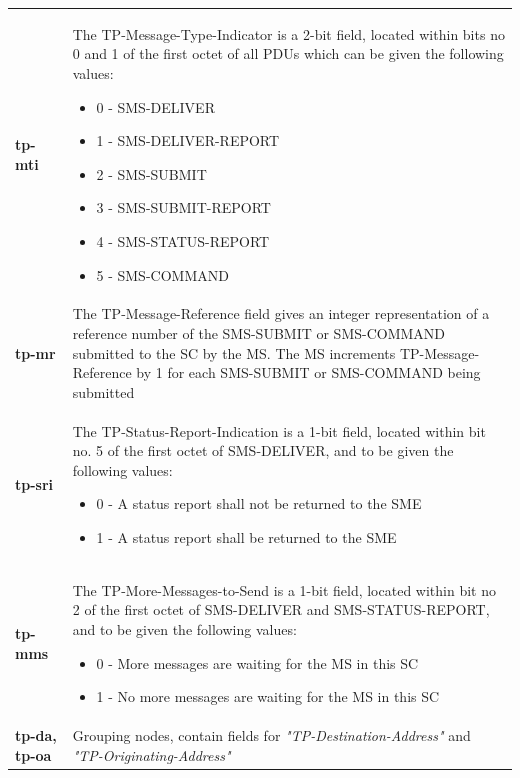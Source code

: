 \documentclass[a4paper,latin]{paper}
\begin{document}
\begin{tabularx}{\textwidth}{ | l | X |}
	\textbf{tp-mti}				& The TP-Message-Type-Indicator is a 2-bit field, located within bits no 0 and 1 of the first octet of all PDUs which can 
						  be given the following values:
 	  					  \begin{itemize}
						  	\setlength{\itemsep}{0pt}
							\setlength{\parskip}{0pt}
							\setlength{\parsep}{0pt}
							\item 0 - SMS-DELIVER
							\item 1 - SMS-DELIVER-REPORT
							\item 2 - SMS-SUBMIT
							\item 3 - SMS-SUBMIT-REPORT
							\item 4 - SMS-STATUS-REPORT
							\item 5 - SMS-COMMAND
						    \end{itemize} \\ 
	\textbf{tp-mr}				& The TP-Message-Reference field gives an integer representation of a reference number of the SMS-SUBMIT or 
						  SMS-COMMAND submitted to the SC by the MS. The MS increments TP-Message-Reference by 1 for each 
						  SMS-SUBMIT or SMS-COMMAND being submitted \\
	\textbf{tp-sri}				& The TP-Status-Report-Indication is a 1-bit field, located within bit no. 5 of the first octet of SMS-DELIVER, and to be 
						  given the following values:
 	  					  \begin{itemize}
						  	\setlength{\itemsep}{0pt}
							\setlength{\parskip}{0pt}
							\setlength{\parsep}{0pt}
							\item 0 - A status report shall not be returned to the SME  
							\item 1 - A status report shall be returned to the SME
						    \end{itemize} \\ 
	\textbf{tp-mms}				& The TP-More-Messages-to-Send is a 1-bit field, located within bit no 2 of the first octet of SMS-DELIVER and 
						  SMS-STATUS-REPORT, and to be given the following values:
 	  					  \begin{itemize}
						  	\setlength{\itemsep}{0pt}
							\setlength{\parskip}{0pt}
							\setlength{\parsep}{0pt}
							\item 0 - More messages are waiting for the MS in this SC
							\item 1 - No more messages are waiting for the MS in this SC
						    \end{itemize} \\ 
	\textbf{tp-da, tp-oa}			& Grouping nodes, contain fields for \textit{"TP-Destination-Address"} and \textit{"TP-Originating-Address"} \\ 

\end{tabularx}
\end{document}

